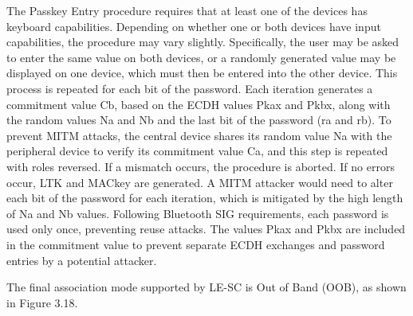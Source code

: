 \documentclass{Configuration_Files/PoliMi3i_thesis}
\begin{document}
The Passkey Entry procedure requires that at least one of the devices has keyboard capabilities. Depending on whether one or both devices have input capabilities, the procedure may vary slightly. Specifically, the user may be asked to enter the same value on both devices, or a randomly generated value may be displayed on one device, which must then be entered into the other device. This process is repeated for each bit of the password. Each iteration generates a commitment value Cb, based on the ECDH values Pkax and Pkbx, along with the random values Na and Nb and the last bit of the password (ra and rb). To prevent MITM attacks, the central device shares its random value Na with the peripheral device to verify its commitment value Ca, and this step is repeated with roles reversed. If a mismatch occurs, the procedure is aborted. If no errors occur, LTK and MACkey are generated. A MITM attacker would need to alter each bit of the password for each iteration, which is mitigated by the high length of Na and Nb values. Following Bluetooth SIG requirements, each password is used only once, preventing reuse attacks. The values Pkax and Pkbx are included in the commitment value to prevent separate ECDH exchanges and password entries by a potential attacker.

The final association mode supported by LE-SC is Out of Band (OOB), as shown in Figure 3.18.
\end{document}
